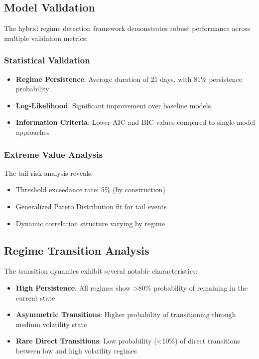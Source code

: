 \subsection{Model Validation}
The hybrid regime detection framework demonstrates robust performance across multiple validation metrics:

\subsubsection{Statistical Validation}
\begin{itemize}
    \item \textbf{Regime Persistence}: Average duration of 21 days, with 81\% persistence probability
    \item \textbf{Log-Likelihood}: Significant improvement over baseline models
    \item \textbf{Information Criteria}: Lower AIC and BIC values compared to single-model approaches
\end{itemize}

\subsubsection{Extreme Value Analysis}
The tail risk analysis \citep{mcneil2000estimation} reveals:
\begin{itemize}
    \item Threshold exceedance rate: 5\% (by construction)
    \item Generalized Pareto Distribution fit for tail events
    \item Dynamic correlation structure varying by regime \citep{engle2002dynamic}
\end{itemize}

\subsection{Regime Transition Analysis}
The transition dynamics exhibit several notable characteristics:

\begin{itemize}
    \item \textbf{High Persistence}: All regimes show >80\% probability of remaining in the current state
    \item \textbf{Asymmetric Transitions}: Higher probability of transitioning through medium volatility state
    \item \textbf{Rare Direct Transitions}: Low probability (<10\%) of direct transitions between low and high volatility regimes
\end{itemize}

